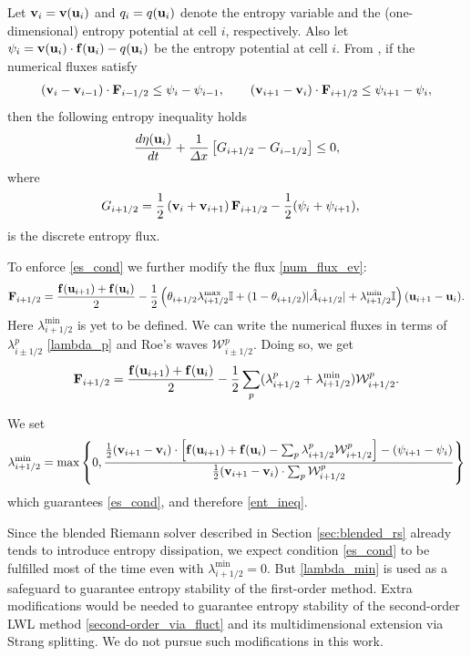 \documentclass[preprint, 11pt]{article}
\newcommand{\W}{{\mathcal W}}
\newcommand{\bff}{{\bf f}}
\newcommand{\bfF}{{\bf F}}
\newcommand{\bfu}{{\bf u}}
\newcommand{\bfv}{{\bf v}}
\begin{document}
Let $\bfv_i=\bfv(\bfu_i)$ and $q_i=q(\bfu_i)$ denote the entropy variable and the
(one-dimensional) entropy potential at cell $i$, respectively.
Also let $\psi_i=\bfv(\bfu_i)\cdot \bff(\bfu_i)-q(\bfu_i)$ be the entropy potential at cell $i$.
From \cite[\S 4]{tadmor1987numerical}, if the numerical fluxes satisfy
\begin{align}\label{es_cond}
(\bfv_{i}-\bfv_{i-1})\cdot \bfF_{i-1/2}\leq \psi_{i}-\psi_{i-1},
  \qquad
  (\bfv_{i+1}-\bfv_i)\cdot \bfF_{i+1/2}\leq \psi_{i+1}-\psi_i,
\end{align}
then the following entropy inequality holds
\begin{align}\label{ent_ineq}
  \frac{d\eta(\bfu_i)}{dt}+\frac{1}{\Delta x}\left[G_{i+1/2}-G_{i-1/2}\right]\leq 0,
\end{align}
where
\begin{align*}
    G_{i+1/2} &= \frac{1}{2}\left(\bfv_i+\bfv_{i+1}\right)\bfF_{i+1/2}-\frac{1}{2}(\psi_{i}+\psi_{i+1}),
\end{align*}
is the discrete entropy flux.

To enforce \eqref{es_cond} we further modify the flux \eqref{num_flux_ev}:
\begin{align*}
  \bfF_{i+1/2} = \frac{\bff(\bfu_{i+1})+\bff(\bfu_i)}{2}
  - \frac{1}{2} \left( \theta_{i+1/2}\lambda_{i+1/2}^{\max}\mathbb{I} + (1-\theta_{i+1/2})|\hat A_{i+1/2}| +\lambda_{i+1/2}^{\min}\mathbb{I}\right)(\bfu_{i+1}-\bfu_{i}).
\end{align*}
Here $\lambda_{i+1/2}^{\min}$ is yet to be defined.
We can write the numerical fluxes in terms of $\lambda^p_{i\pm 1/2}$ \eqref{lambda_p}
and Roe's waves $\W_{i\pm 1/2}^p$.
Doing so, we get
\begin{align*}
  \bfF_{i+1/2} = \frac{\bff(\bfu_{i+1})+\bff(\bfu_i)}{2}
  - \frac{1}{2}\sum_p(\lambda_{i+1/2}^p+\lambda_{i+1/2}^{\min})\W_{i+1/2}^p.
\end{align*}

We set
\begin{align}\label{lambda_min}
  \lambda_{i+1/2}^{\min} = \max\left\{0,\frac{\frac{1}{2}(\bfv_{i+1}-\bfv_{i})\cdot\left[\bff(\bfu_{i+1})+\bff(\bfu_{i})-\sum_p\lambda_{i+1/2}^p\W_{i+1/2}^p\right]-(\psi_{i+1}-\psi_i)}{\frac{1}{2}(\bfv_{i+1}-\bfv_{i})\cdot\sum_p\W_{i+1/2}^p}\right\}
\end{align}
which guarantees \eqref{es_cond}, and therefore \eqref{ent_ineq}.

Since the blended Riemann solver described in Section \ref{sec:blended_rs} already
tends to introduce entropy dissipation,
we expect condition \eqref{es_cond} to be fulfilled most of the time even with $\lambda_{i+1/2}^{\min}=0$.
But \eqref{lambda_min} is used as a safeguard to guarantee entropy stability of the first-order method.
Extra modifications would be needed to guarantee entropy stability of the second-order LWL method
\eqref{second-order_via_fluct} and its multidimensional extension via Strang splitting.
We do not pursue such modifications in this work.
\end{document}
